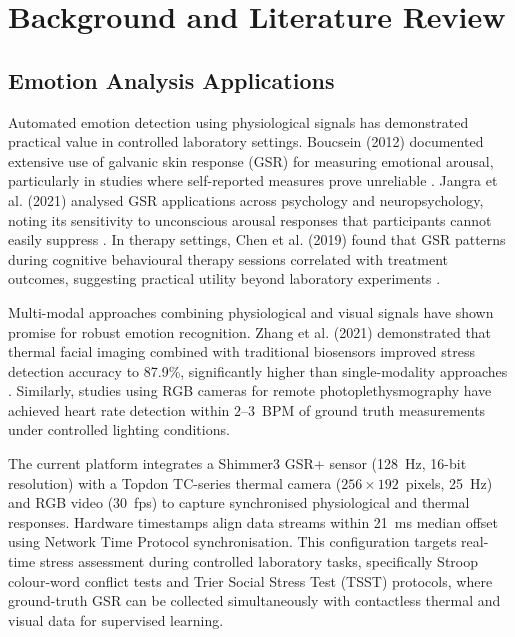 \documentclass{report}
\begin{document}
    \chapter{Background and Literature Review}
    \label{ch:background}

    \section{Emotion Analysis Applications}
    \label{sec:emotion_apps}

    Automated emotion detection using physiological signals has demonstrated practical value in controlled laboratory settings. Boucsein (2012) documented extensive use of galvanic skin response (GSR) for measuring emotional arousal, particularly in studies where self-reported measures prove unreliable \cite{boucsein2012}. Jangra et al. (2021) analysed GSR applications across psychology and neuropsychology, noting its sensitivity to unconscious arousal responses that participants cannot easily suppress \cite{jangra2021}. In therapy settings, Chen et al. (2019) found that GSR patterns during cognitive behavioural therapy sessions correlated with treatment outcomes, suggesting practical utility beyond laboratory experiments \cite{chen2019}.

    Multi-modal approaches combining physiological and visual signals have shown promise for robust emotion recognition. Zhang et al. (2021) demonstrated that thermal facial imaging combined with traditional biosensors improved stress detection accuracy to 87.9\%, significantly higher than single-modality approaches \cite{zhang2021}. Similarly, studies using RGB cameras for remote photoplethysmography have achieved heart rate detection within $2$--$3$~BPM of ground truth measurements under controlled lighting conditions.

    The current platform integrates a Shimmer3 GSR+ sensor (128~Hz, 16-bit resolution) with a Topdon TC-series thermal camera ($256 \times 192$~pixels, 25~Hz) and RGB video (30~fps) to capture synchronised physiological and thermal responses. Hardware timestamps align data streams within 21~ms median offset using Network Time Protocol synchronisation. This configuration targets real-time stress assessment during controlled laboratory tasks, specifically Stroop colour-word conflict tests and Trier Social Stress Test (TSST) protocols, where ground-truth GSR can be collected simultaneously with contactless thermal and visual data for supervised learning.
\end{document}
